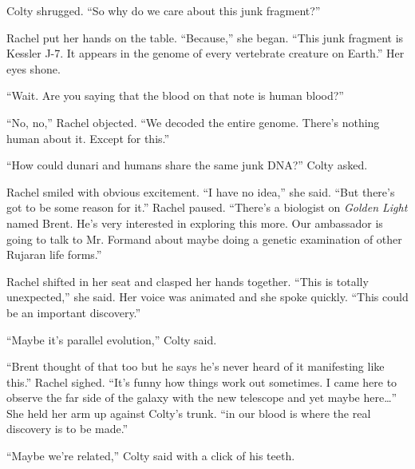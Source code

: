 Colty shrugged. ``So why do we care about this junk fragment?''

Rachel put her hands on the table. ``Because,'' she began. ``This junk fragment is Kessler J-7.
It appears in the genome of every vertebrate creature on Earth.'' Her eyes shone.

``Wait. Are you saying that the blood on that note is human blood?''

``No, no,'' Rachel objected. ``We decoded the entire genome. There's nothing human about it.
Except for this.''

``How could dunari and humans share the same junk DNA?'' Colty asked.

Rachel smiled with obvious excitement. ``I have no idea,'' she said. ``But there's got to be
some reason for it.'' Rachel paused. ``There's a biologist on \textit{Golden Light} named Brent.
He's very interested in exploring this more. Our ambassador is going to talk to Mr. Formand
about maybe doing a genetic examination of other Rujaran life forms.''

Rachel shifted in her seat and clasped her hands together. ``This is totally unexpected,'' she
said. Her voice was animated and she spoke quickly. ``This could be an important discovery.''

``Maybe it's parallel evolution,'' Colty said.

``Brent thought of that too but he says he's never heard of it manifesting like this.'' Rachel
sighed. ``It's funny how things work out sometimes. I came here to observe the far side of the
galaxy with the new telescope and yet maybe here\ldots'' She held her arm up against Colty's
trunk. ``in our blood is where the real discovery is to be made.''

``Maybe we're related,'' Colty said with a click of his teeth.
